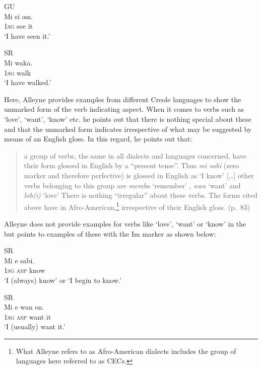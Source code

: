 \ex
GU\\
\gll Mi si ǝm.\\
\textsc{1sg} see it \\
\glt `I have seen it.'

\ex SR\\
\gll  Mi waka.\\
\textsc{1sg} walk     \\
\glt `I have walked.' 
\z \z

Here, Alleyne provides examples from different Creole languages to
show the unmarked form of the verb indicating  aspect.  When
it comes to verbs such as `love', `want', `know' etc. he points out
that there is nothing special about these and that the unmarked form
indicates  irrespective of what may be suggested by means of
an English gloss.  In this regard, he points out that:

\begin{quote}
a group of verbs, the same in all dialects and languages concerned,
have their  form glossed in English by a ``present
tense”. Thus \textit{mi sabi} (zero marker and therefore perfective)
is glossed in English as `I know' […] other verbs belonging to this
group are \textit{memba} `remember' , \textit{wan} `want' and
\textit{lob(i)} `love' There is nothing “irregular” about these
verbs. The forms cited above have  in
Afro-American,\footnote{What Alleyne refers to as Afro-American
  dialects includes the group of languages here referred to as CECs.}
irrespective of their English gloss. (p.~83)
\end{quote}

Alleyne does not provide examples for verbs like `love', `want' or
`know' in the  but points to examples of these with the
Im marker as shown below:

\ea\label{ex:2:3} \citep[83]{Alleyne1980}
\ea SR\\

\gll Mi e sabi.\\
		\textsc{1sg} \textsc{asp} know\\
\glt `I (always) know' or `I begin to know.'

\ex SR\\
\gll Mi e wan en.\\
	\textsc{1sg} \textsc{asp} want it                \\
\glt `I (usually) want it.'

